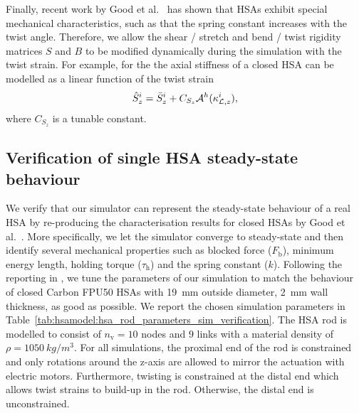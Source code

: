 Finally, recent work by Good et al.~\cite{good2022expanding} has shown that \glspl{HSA} exhibit special mechanical characteristics, such as that the spring constant increases with the twist angle. Therefore, we allow the shear / stretch and bend / twist rigidity matrices $S$ and $B$ to be modified dynamically during the simulation with the twist strain. For example, for the the axial stiffness of a closed \gls{HSA} can be modelled as a linear function of the twist strain~\cite{good2022expanding}
\begin{equation}
    \hat{S}_{z}^i = \Bar{S}_{z}^i + C_{S_z} \mathcal{A}^h(\kappa_{\mathcal{L},z}^i),
\end{equation}
where $C_{S_z}$ is a tunable constant.

\subsection{Verification of single HSA steady-state behaviour}\label{sub:hsamodel:hsa_robot_simulation:verification_good}
We verify that our simulator can represent the steady-state behaviour of a real \gls{HSA} by re-producing the characterisation results for closed \glspl{HSA} by Good et al.~\cite{good2022expanding}.
More specifically, we let the simulator converge to steady-state and then identify several mechanical properties such as blocked force ($F_\mathrm{b}$), minimum energy length, holding torque ($\tau_\mathrm{h}$) and the spring constant ($k$).
Following the reporting in \cite{good2022expanding}, we tune the parameters of our simulation to match the behaviour of closed Carbon FPU50 \glspl{HSA} with \SI{19}{mm} outside diameter, \SI{2}{mm} wall thickness, as good as possible. We report the chosen simulation parameters in Table~\ref{tab:hsamodel:hsa_rod_parameters_sim_verification}. 
The \gls{HSA} rod is modelled to consist of $n_\mathrm{v} = 10$ nodes and $9$ links with a material density of $\rho = \SI{1050}{kg \per m^3}$. For all simulations, the proximal end of the rod is constrained and only rotations around the z-axis are allowed to mirror the actuation with electric motors. Furthermore, twisting is constrained at the distal end which allows twist strains to build-up in the rod. Otherwise, the distal end is unconstrained.

